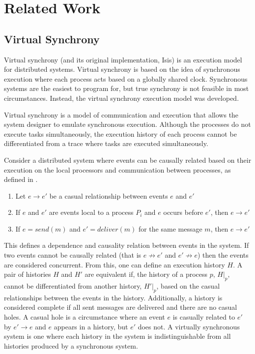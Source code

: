 

\chapter{Related Work}

\section{Virtual Synchrony}
Virtual synchrony (and its original implementation, Isis\cite{ISISTOOLKIT}) is an execution model for distributed systems. Virtual synchrony is based on the idea of synchronous execution where each process acts based on a globally shared clock. Synchronous systems are the easiest to program for, but true synchrony is not feasible in most circumstances. Instead, the virtual synchrony execution model was developed. 

Virtual synchrony is a model of communication and execution that allows the system designer to emulate synchronous execution. Although the processes do not execute tasks simultaneously, the execution history of each process cannot be differentiated from a trace where tasks are executed simultaneously. 

Consider a distributed system where events can be causally related based on their execution on the local processors and communication between processes, as defined in \cite[p~.101]{ISISTOOLKIT}. 

\begin{enumerate}
	\item Let $e \rightarrow e'$ be a casual relationship between events $e$ and $e'$
    \item If $e$ and $e'$ are events local to a process $P_{i}$ and $e$ occurs before $e'$, then $e \rightarrow e'$
    \item If $e = send(m)$ and $e'=deliver(m)$ for the same message $m$, then $e \rightarrow e'$
\end{enumerate}

This defines a dependence and causality relation between events in the system. If two events cannot be causally related (that is $e \not\rightarrow e'$ and $e' \not\rightarrow e$) then the events are considered concurrent. From this, one can define an execution history $H$. A pair of histories $H$ and $H'$ are equivalent if, the history of a process $p$, $H|_{p}$, cannot be differentiated from another history, $H'|_{p}$, based on the casual relationships between the events in the history. \cite[p~.103]{ISISTOOLKIT} Additionally, a history is considered complete if all sent messages are delivered and there are no casual holes. A casual hole is a circumstance where an event $e$ is casually related to $e'$ by $e' \rightarrow e$ and $e$ appears in a history, but $e'$ does not. A virtually synchronous system is one where each history in the system is indistinguishable from all histories produced by a synchronous system. \cite[p~.104]{ISISTOOLKIT}

